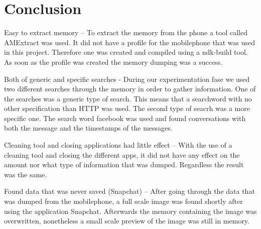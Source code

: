 \section{Conclusion}
Easy to extract memory – To extract the memory from the phone a tool called AMExtract was used. It did not have a profile for the mobilephone that was used in this project. Therefore one was created and compiled using a ndk-build tool. As soon as the profile was created the memory dumping was a success.

Both of generic and specific searches - During our experimentation fase we used two different searches through the memory in order to gather information. One of the searches was a generic type of search. This means that a searchword with no other specification than HTTP was used. The second type of seacrh was a more specific one. The search word facebook was used and found conversations with both the message and the timestamps of the messages.

Cleaning tool and closing applications had little effect – With the use of a cleaning tool and closing the different apps, it did not have any effect on the amount nor what type of information that was dumped. Regardless the result was the same.

Found data that was never saved (Snapchat) – After going through the data that was dumped from the mobilephone, a full scale image was found shortly after using the application Snapchat. Afterwards the memory containing the image was overwritten, nonetheless a small scale preview of the image was still in memory.
 \nocite{Androulidakis2016}